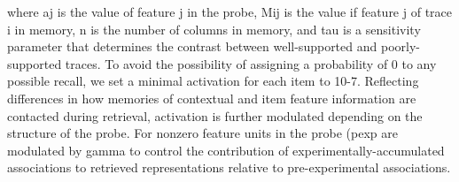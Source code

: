 {}where \markdownRendererDollarSign{}aj\markdownRendererDollarSign{} is the value of feature \markdownRendererDollarSign{}j\markdownRendererDollarSign{} in the probe, \markdownRendererDollarSign{}M\markdownRendererUnderscore{}\markdownRendererLeftBrace{}ij\markdownRendererRightBrace{}\markdownRendererDollarSign{} is the value if feature \markdownRendererDollarSign{}j\markdownRendererDollarSign{} of trace \markdownRendererDollarSign{}i\markdownRendererDollarSign{} in memory, \markdownRendererDollarSign{}n\markdownRendererDollarSign{} is the number of columns in memory, and \markdownRendererDollarSign{}\markdownRendererBackslash{}tau\markdownRendererDollarSign{} is a sensitivity parameter that determines the contrast between well-supported and poorly-supported traces. To avoid the possibility of assigning a probability of 0 to any possible recall, we set a minimal activation for each item to \markdownRendererDollarSign{}10\markdownRendererCircumflex{}\markdownRendererLeftBrace{}-7\markdownRendererRightBrace{}\markdownRendererDollarSign{}.\markdownRendererInterblockSeparator
{}Reflecting differences in how memories of contextual and item feature information are contacted during retrieval, activation is further modulated depending on the structure of the probe. For nonzero feature units in the probe (\markdownRendererDollarSign{}p\markdownRendererLeftBrace{}exp\markdownRendererRightBrace{}\markdownRendererDollarSign{} are modulated by \markdownRendererDollarSign{}\markdownRendererBackslash{}gamma\markdownRendererDollarSign{} to control the contribution of experimentally-accumulated associations to retrieved representations relative to pre-experimental associations.\markdownRendererInterblockSeparator
